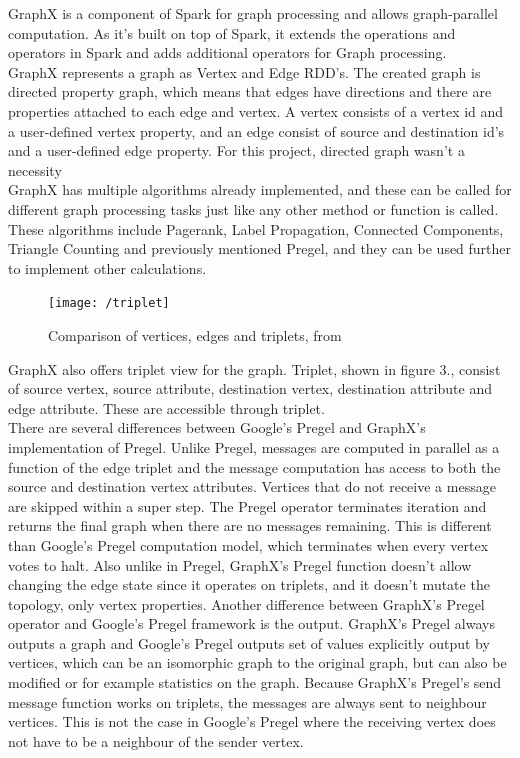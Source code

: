 \documentclass{article}
\theoremstyle{definition}
\begin{document}
GraphX is a component of Spark for graph processing and allows graph-parallel computation. As it's built on top of Spark, it extends the operations and operators in Spark and adds additional operators for Graph processing.  \\

GraphX represents a graph as Vertex and Edge RDD's. The created graph is directed property graph, which means that edges have directions and there are properties attached to each edge and vertex.  A vertex consists of a vertex id and a user-defined vertex property, and an edge consist of source and destination id's and a user-defined edge property. For this project, directed graph wasn't a necessity \\

GraphX has multiple algorithms already implemented, and these can be called for different graph processing tasks just like any other method or function is called. These algorithms include Pagerank, Label Propagation, Connected Components, Triangle Counting and previously mentioned Pregel, and they can be used further to implement other calculations. \\

\begin{figure}[H]
\centering
\texttt{[image: /triplet]}
\caption{Comparison of vertices, edges and triplets, from \cite{GraphX} }
\end{figure}

GraphX also offers triplet view for the graph. Triplet, shown in figure 3., consist of source vertex, source attribute, destination vertex, destination attribute and edge attribute. These are accessible through triplet. \\

There are several differences between Google's Pregel and GraphX's implementation of Pregel. Unlike Pregel, messages are computed in parallel as a function of the edge triplet and the message computation has access to both the source and destination vertex attributes. Vertices that do not receive a message are skipped within a super step. The Pregel operator terminates iteration and returns the final graph when there are no messages remaining. This is different than Google's Pregel computation model, which terminates when every vertex votes to halt. Also unlike in Pregel, GraphX's Pregel function doesn't allow changing the edge state since it operates on triplets, and it doesn't mutate the topology, only vertex properties. Another difference between GraphX's Pregel operator and Google's Pregel framework is the output. GraphX's Pregel always outputs a graph and Google's Pregel outputs set of values explicitly output by vertices, which can be an isomorphic graph to the original graph, but can also be modified or for example statistics on the graph. Because GraphX's Pregel's send message function works on triplets, the messages are always sent to neighbour vertices. This is not the case in Google's Pregel where the receiving vertex does not have to be a neighbour of the sender vertex. \\
\end{document}
